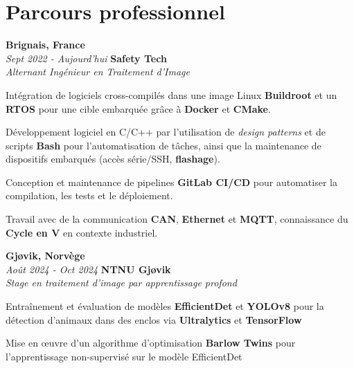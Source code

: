 
    \section{Parcours professionnel}
        \begin{twocolentry}{
			\textbf{Brignais, France} \\
			\textit{Sept 2022 - Aujourd'hui}
            }{
            \textbf{Safety Tech} \\
            \textit{Alternant Ingénieur en Traitement d'Image}
            }
        \end{twocolentry}

        \begin{onecolentry}
            \begin{highlights}
                \item Intégration de logiciels cross-compilés dans une image Linux \textbf{Buildroot} et un \textbf{RTOS} pour une cible embarquée grâce à \textbf{Docker} et \textbf{CMake}.
                \item Développement logiciel en C/C++ par l'utilisation de \textit{design patterns} et de scripts \textbf{Bash} pour l'automatisation de tâches, ainsi que la maintenance de dispositifs embarqués (accès série/SSH, \textbf{flashage}).
                \item Conception et maintenance de pipelines \textbf{GitLab CI/CD} pour automatiser la compilation, les tests et le déploiement.
                \item Travail avec de la communication \textbf{CAN}, \textbf{Ethernet} et \textbf{MQTT}, connaissance du \textbf{Cycle en V} en contexte industriel.
            \end{highlights}
        \end{onecolentry}

        \begin{twocolentry}{
			\textbf{Gjøvik, Norvège} \\
			\textit{Août 2024 - Oct 2024}
            }{
			\textbf{NTNU Gjøvik} \\
			\textit{Stage en traitement d'image par apprentissage profond}
            }
        \end{twocolentry}

        \begin{onecolentry}
            \begin{highlights}
                \item Entraînement et évaluation de modèles \textbf{EfficientDet} et \textbf{YOLOv8} pour la détection d'animaux dans des enclos via \textbf{Ultralytics} et \textbf{TensorFlow}
                \item Mise en œuvre d'un algorithme d'optimisation \textbf{Barlow Twins} pour l'apprentissage non-supervisé sur le modèle EfficientDet
            \end{highlights}
        \end{onecolentry}

